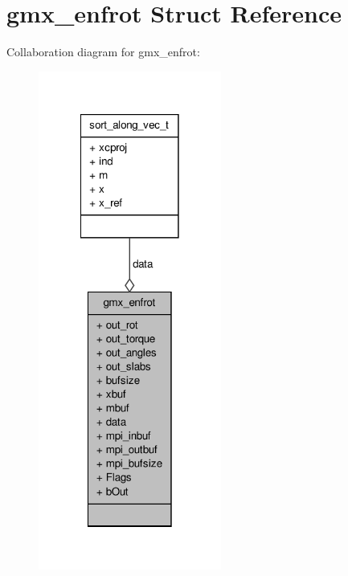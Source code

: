 \hypertarget{structgmx__enfrot}{\section{gmx\-\_\-enfrot \-Struct \-Reference}
\label{structgmx__enfrot}
}


\-Collaboration diagram for gmx\-\_\-enfrot\-:
\nopagebreak
\begin{figure}[H]
\begin{center}
\leavevmode
\includegraphics[width=170pt]{structgmx__enfrot__coll__graph}
\end{center}
\end{figure}
